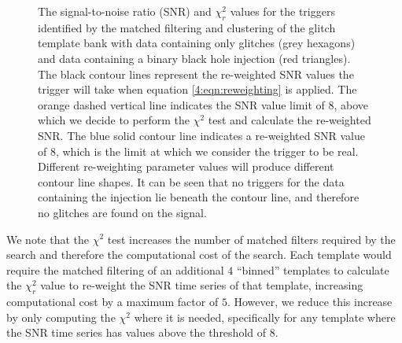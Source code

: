 \begin{figure}
  \caption{The signal-to-noise ratio (SNR) and $\chi_{r}^{2}$ values for the triggers identified by the matched filtering and clustering of the \scladj glitch template bank with data containing only \scladj glitches (grey hexagons) and data containing a binary black hole \gwadj injection (red triangles). The black contour lines represent the re-weighted SNR values the trigger will take when equation \ref{4:eqn:reweighting} is applied. The orange dashed vertical line indicates the SNR value limit of 8, above which we decide to perform the $\chi^{2}$ test and calculate the re-weighted SNR. The blue solid contour line indicates a re-weighted SNR value of 8, which is the limit at which we consider the trigger to be real. Different re-weighting parameter values will produce different contour line shapes. It can be seen that no triggers for the data containing the \gwadj injection lie beneath the contour line, and therefore no \scladj glitches are found on the \gwadj signal.}
  \label{4:fig:chi_snr}
\end{figure}

We note that the $\chi^{2}$ test increases the number of matched filters required by the search and therefore the computational cost of the search. Each template would require the matched filtering of an additional $4$ ``binned'' templates to calculate the $\chi_{r}^{2}$ value to re-weight the SNR time series of that template, increasing computational cost by a maximum factor of $5$. However, we reduce this increase by only computing the $\chi^{2}$ where it is needed, specifically for any template where the SNR time series has values above the threshold of 8.

